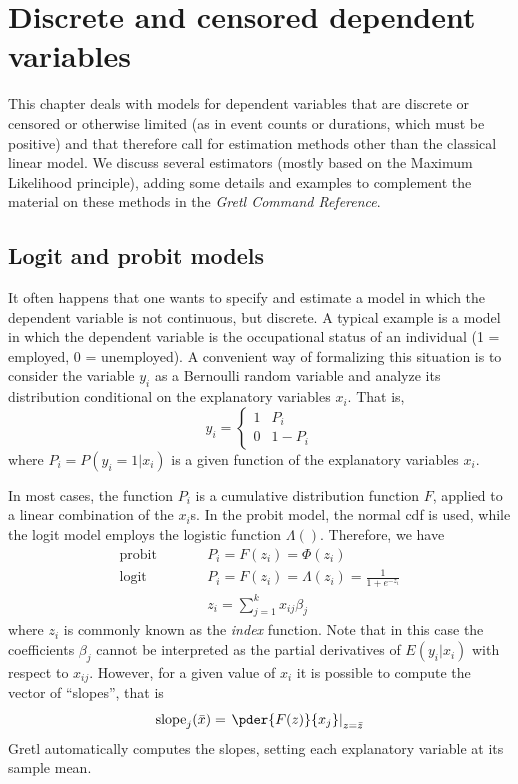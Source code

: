 \chapter{Discrete and censored dependent variables}
\label{chap:discr-models}

This chapter deals with models for dependent variables that are
discrete or censored or otherwise limited (as in event counts or
durations, which must be positive) and that therefore call for
estimation methods other than the classical linear model. We discuss
several estimators (mostly based on the Maximum Likelihood principle),
adding some details and examples to complement the material on
these methods in the \emph{Gretl Command Reference}.

\section{Logit and probit models}
\label{sec:logit-probit}

It often happens that one wants to specify and estimate a model in
which the dependent variable is not continuous, but discrete. A
typical example is a model in which the dependent variable is the
occupational status of an individual (1 = employed, 0 = unemployed). A
convenient way of formalizing this situation is to consider the
variable $y_i$ as a Bernoulli random variable and analyze its
distribution conditional on the explanatory variables $x_i$.  That is,
%
\begin{equation}
  \label{eq:qr-Bernoulli}
  y_i = \left\{ 
    \begin{array}{ll} 
      1 & P_i \\ 0 & 1 - P_i 
    \end{array}
    \right.
\end{equation}
%
where $P_i = P(y_i = 1 | x_i) $ is a given function of the explanatory
variables $x_i$.

In most cases, the function $P_i$ is a cumulative distribution
function $F$, applied to a linear combination of the $x_i$s. In the
probit model, the normal cdf is used, while the logit model employs
the logistic function $\Lambda()$. Therefore, we have
%
\begin{eqnarray}
  \label{eq:qr-link}
  \textrm{probit} & \qquad & P_i = F(z_i) = \Phi(z_i)  \\
  \textrm{logit}  & \qquad & P_i = F(z_i) = \Lambda(z_i) = \frac{1}{1 + e^{-z_i}} \\
  & &z_i = \sum_{j=1}^k x_{ij} \beta_j
\end{eqnarray}
%
where $z_i$ is commonly known as the \emph{index} function. Note that
in this case the coefficients $\beta_j$ cannot be interpreted as the
partial derivatives of $E(y_i | x_i)$ with respect to
$x_{ij}$.  However, for a given value of $x_i$ it is possible to
compute the vector of ``slopes'', that is
\[
  \mathrm{slope}_j(\bar{x}) = \left. \pder{F(z)}{x_j} \right|_{z =
    \bar{z}}
\]
Gretl automatically computes the slopes, setting each
explanatory variable at its sample mean.

